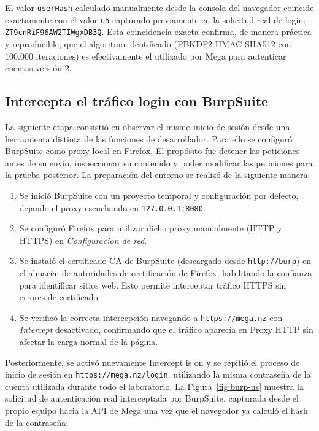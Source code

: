 \documentclass[letter,12pt]{article}
\newcommand{\sangria}{\hspace*{1.25cm}} %
\begin{document}
El valor \texttt{userHash} calculado manualmente desde la consola del navegador coincide exactamente con el valor \texttt{uh} capturado previamente en la solicitud real de login: \texttt{ZT9cnRiF96AW2TIWgxDB3Q}. Esta coincidencia exacta confirma, de manera práctica y reproducible, que el algoritmo identificado (PBKDF2-HMAC-SHA512 con 100.000 iteraciones) es efectivamente el utilizado por Mega para autenticar cuentas versión 2.

\subsection{Intercepta el tráfico login con BurpSuite}
\label{sec:burp}

\sangria La siguiente etapa consistió en observar el mismo inicio de sesión desde una herramienta distinta de las funciones de desarrollador. Para ello se configuró BurpSuite como proxy local en Firefox. El propósito fue detener las peticiones antes de su envío, inspeccionar su contenido y poder modificar las peticiones para la prueba posterior. La preparación del entorno se realizó de la siguiente manera:

\begin{enumerate}
    \item Se inició BurpSuite con un proyecto temporal y configuración por defecto, dejando el proxy escuchando en \texttt{127.0.0.1:8080}.
    \item Se configuró Firefox para utilizar dicho proxy manualmente (HTTP y HTTPS) en \textit{Configuración de red}.
    \item Se instaló el certificado CA de BurpSuite (descargado desde \texttt{http://burp}) en el almacén de autoridades de certificación de Firefox, habilitando la confianza para identificar sitios web. Esto permite interceptar tráfico HTTPS sin errores de certificado.
    \item Se verificó la correcta intercepción navegando a \texttt{https://mega.nz} con \textit{Intercept} desactivado, confirmando que el tráfico aparecía en Proxy \textrightarrow{} HTTP sin afectar la carga normal de la página.
\end{enumerate}

Posteriormente, se activó nuevamente Intercept is on y se repitió el proceso de inicio de sesión en \texttt{https://mega.nz/login}, utilizando la misma contraseña de la cuenta utilizada durante todo el laboratorio. La Figura~\ref{fig:burp-us} muestra la solicitud de autenticación real interceptada por BurpSuite, capturada desde el propio equipo hacia la API de Mega una vez que el navegador ya calculó el hash de la contraseña:
\end{document}
